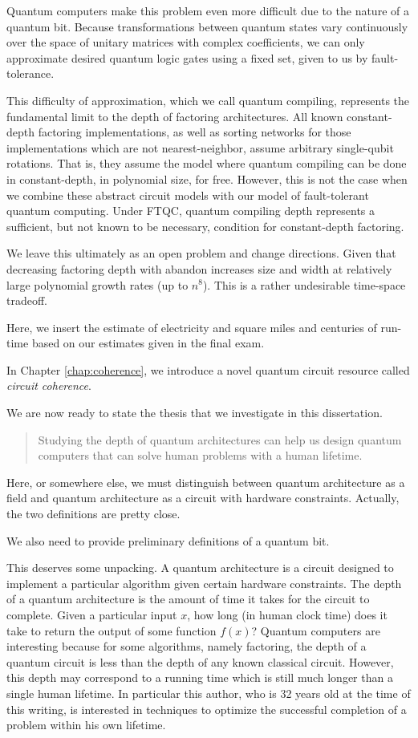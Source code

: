 Quantum computers make this problem even more difficult due to the nature of a quantum bit. Because transformations between quantum states vary continuously over the space of unitary matrices with complex coefficients, we can only approximate desired quantum logic gates using a fixed set, given to us by fault-tolerance.

This difficulty of approximation, which we call quantum compiling, represents the fundamental limit to the depth of factoring architectures. All known constant-depth factoring implementations, as well as sorting networks for those implementations which are not nearest-neighbor, assume arbitrary single-qubit rotations. That is, they assume the model where quantum compiling can be done in constant-depth, in polynomial size, for free. However, this is not the case when we combine these abstract circuit models with our model of fault-tolerant quantum computing. Under FTQC, quantum compiling depth represents a sufficient, but not known to be necessary, condition for constant-depth factoring. 

We leave this ultimately as an open problem and change directions.
Given that decreasing factoring depth with abandon increases size and width at relatively large polynomial growth rates (up to $n^8$). This is a rather undesirable time-space tradeoff.

Here, we insert the estimate of electricity and square miles and centuries of run-time based on our estimates given in the final exam.

In Chapter \ref{chap:coherence}, we introduce a novel quantum circuit resource called \emph{circuit coherence}.

We are now ready to state the thesis that we investigate in this dissertation.

\begin{quote}
Studying the depth of quantum architectures can help us design quantum computers that can solve
human problems with a human lifetime.
\end{quote}

Here, or somewhere else, we must distinguish between quantum architecture as a field and quantum architecture as a
circuit with hardware constraints. Actually, the two definitions are pretty close.

We also need to provide preliminary definitions of a quantum bit.

This deserves some unpacking. A quantum architecture is a circuit designed to implement a particular algorithm given certain
hardware constraints. The depth of a quantum architecture is the amount of time it takes for the circuit to complete.
Given a particular input $x$, how long (in human clock time) does it take to return the output of some function $f(x)$?
Quantum computers are interesting because for some algorithms, namely factoring, the depth of a quantum circuit is
less than the depth of any known classical circuit. However, this depth may correspond to a running time which is
still much longer than a single human lifetime. In particular this author, who is 32 years old at the time of this
writing, is interested in techniques to optimize the successful completion of a problem within his own lifetime.

